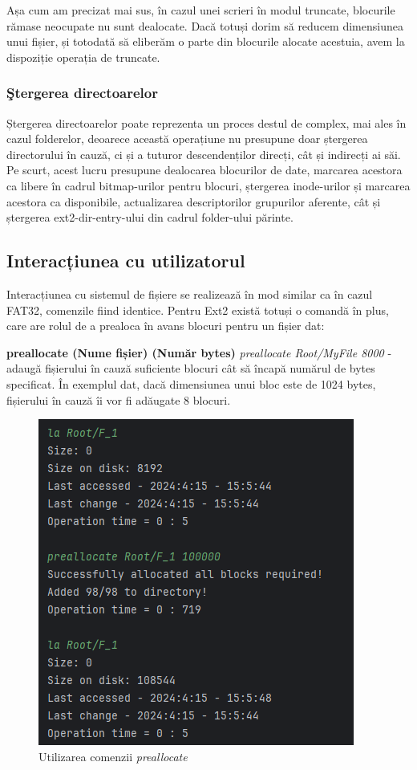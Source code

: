 Așa cum am precizat mai sus, în cazul unei scrieri în modul truncate, blocurile rămase neocupate nu sunt dealocate. Dacă totuși dorim să reducem dimensiunea unui fișier, și totodată să eliberăm o parte din blocurile alocate acestuia, avem la dispoziție operația de truncate.

\subsubsection{Ştergerea directoarelor}

Ștergerea directoarelor poate reprezenta un proces destul de complex, mai ales în cazul folderelor, deoarece această operațiune nu presupune doar ștergerea directorului în cauză, ci și a tuturor descendenților direcți, cât și indirecți ai săi. Pe scurt, acest lucru presupune dealocarea blocurilor de date, marcarea acestora ca libere în cadrul bitmap-urilor pentru blocuri, ștergerea inode-urilor și marcarea acestora ca disponibile, actualizarea descriptorilor grupurilor aferente, cât și ștergerea ext2-dir-entry-ului din cadrul folder-ului părinte.

\subsection{Interacțiunea cu utilizatorul}

Interacțiunea cu sistemul de fișiere se realizează în mod similar ca în cazul FAT32, comenzile fiind identice. Pentru Ext2 există totuși o comandă în plus, care are rolul de a prealoca în avans blocuri pentru un fișier dat:

\bigskip

\textbf{preallocate (Nume fișier) (Număr bytes)} \textit{preallocate Root/MyFile 8000} - adaugă fișierului în cauză suficiente blocuri cât să încapă numărul de bytes specificat. În exemplul dat, dacă dimensiunea unui bloc este de 1024 bytes, fișierului în cauză îi vor fi adăugate 8 blocuri.

\bigskip

\begin{figure}[h]
    \centering
    \includegraphics[width=0.7\linewidth]{images/2.8.png}
    \caption{Utilizarea comenzii \textit{preallocate}}
    \label{fig:enter-label}
\end{figure}

